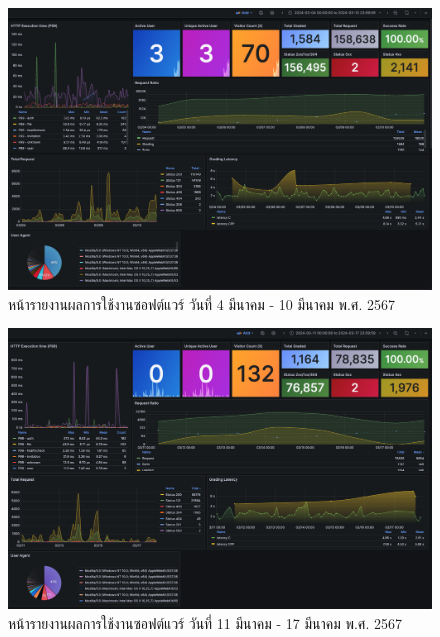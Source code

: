 \documentclass[12pt,one side,openright,a4paper]{cpe-thesis-th}
\begin{document}
\begin{figure}[H]
    \centering
    \includegraphics[width=15cm]{figure/results/grafana/grafana-mar04-mar10.png}
    \caption[หน้ารายงานผลการใช้งานซอฟต์แวร์ วันที่ 4 มีนาคม - 10 มีนาคม พ.ศ. 2567]{หน้ารายงานผลการใช้งานซอฟต์แวร์ วันที่ 4 มีนาคม - 10 มีนาคม พ.ศ. 2567}
    \label{fig:res-grafana-m04m10}
\end{figure}

\begin{figure}[H]
    \centering
    \includegraphics[width=15cm]{figure/results/grafana/grafana-mar11-mar17.png}
    \caption[หน้ารายงานผลการใช้งานซอฟต์แวร์ วันที่ 11 มีนาคม - 17 มีนาคม พ.ศ. 2567]{หน้ารายงานผลการใช้งานซอฟต์แวร์ วันที่ 11 มีนาคม - 17 มีนาคม พ.ศ. 2567}
    \label{fig:res-grafana-m11m17}
\end{figure}
\end{document}
